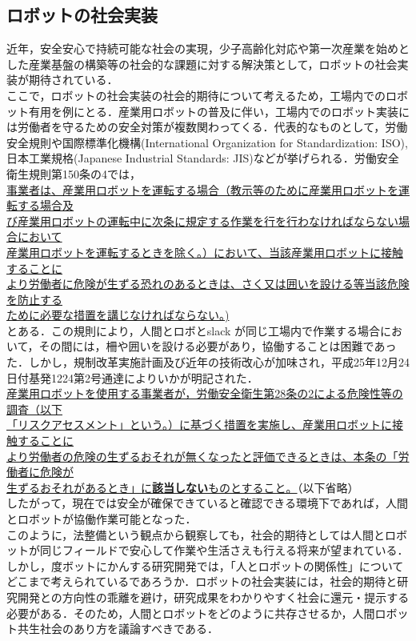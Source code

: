 \subsection{ロボットの社会実装}
近年，安全安心で持続可能な社会の実現，少子高齢化対応や第一次産業を始めとした産業基盤の構築等の社会的な課題に対する解決策として，ロボットの社会実装が期待されている．\\
ここで，ロボットの社会実装の社会的期待について考えるため，工場内でのロボット有用を例にとる．産業用ロボットの普及に伴い，工場内でのロボット実装には労働者を守るための安全対策が複数関わってくる．代表的なものとして，労働安全規則や国際標準化機構(International Organization for Standardization: ISO), 日本工業規格(Japanese Industrial Standards: JIS)などが挙げられる．労働安全衛生規則第150条の4では，\\
 \underline{事業者は、産業用ロボットを運転する場合（教示等のために産業用ロボットを運転する場合及}\\
 \underline{び産業用ロボットの運転中に次条に規定する作業を行を行わなければならない場合において}\\
 \underline{産業用ロボットを運転するときを除く。）において、当該産業用ロボットに接触することに}\\
 \underline{より労働者に危険が生ずる恐れのあるときは、さく又は囲いを設ける等当該危険を防止する}\\
 \underline{ために必要な措置を講じなければならない。)}\\
  とある．この規則により，人間とロボとslack が同じ工場内で作業する場合において，その間には，柵や囲いを設ける必要があり，協働することは困難であった．しかし，規制改革実施計画及び近年の技術改心が加味され，平成25年12月24日付基発1224第2号通達によりいかが明記された．\\
 \underline{産業用ロボットを使用する事業者が，労働安全衛生第28条の2による危険性等の調査（以下}\\
 \underline{「リスクアセスメント」という。）に基づく措置を実施し、産業用ロボットに接触することに}\\
 \underline{より労働者の危険の生ずるおそれが無くなったと評価できるときは、本条の「労働者に危険が}\\
 \underline{生ずるおそれがあるとき」に{\bf 該当しない}ものとすること。}（以下省略）\\
したがって，現在では安全が確保できていると確認できる環境下であれば，人間とロボットが協働作業可能となった．\\
このように，法整備という観点から観察しても，社会的期待としては人間とロボットが同じフィールドで安心して作業や生活さえも行える将来が望まれている．しかし，度ボットにかんする研究開発では，「人とロボットの関係性」についてどこまで考えられているであろうか．ロボットの社会実装には，社会的期待と研究開発との方向性の乖離を避け，研究成果をわかりやすく社会に還元・提示する必要がある．そのため，人間とロボットをどのように共存させるか，人間ロボット共生社会のあり方を議論すべきである．
